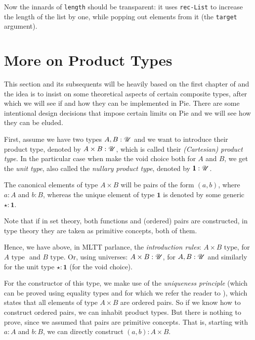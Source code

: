 Now the innards of \texttt{length} should be transparent: it uses \texttt{rec-List}
to increase the length of the list by one, while popping out elements
from it (the \texttt{target} argument).

\section{More on Product Types}
\label{sec:more-prod}

\indent\indent This section and its subsequents will be heavily based on the first chapter of
\cite{hott} and the idea is to insist on some theoretical aspects of certain
composite types, after which we will see if and how they can be implemented
in Pie. There are some intentional design decisions that impose certain
limits on Pie and we will see how they can be eluded.

First, assume we have two types $ A, B : \mathscr{U} $ and we want to introduce
their product type, denoted by $ A \times B : \mathscr{U} $, which is called their
\emph{(Cartesian) product type.} In the particular case when make the
void choice both for $ A $ and $ B $, we get the \emph{unit type},
also called the \emph{nullary product type}, denoted by $ \pmb{1} : \mathscr{U} $.

The canonical elements of type $ A \times B $ will be pairs of the form
$ (a, b) $, where $ a : A $ and $ b : B $, whereas the unique element of
type $ \pmb{1} $ is denoted by some generic $ \star : \pmb{1} $.

Note that if in set theory, both functions and (ordered) pairs are constructed,
in type theory they are taken as primitive concepts, both of them.

Hence, we have above, in MLTT parlance, the \emph{introduction rules}:
$ A \times B \text{ type} $, for $ A \text{ type } $ and $ B \text{ type} $.
Or, using universes: $ A \times B : \mathscr{U} $, for $ A, B : \mathscr{U} $ and
similarly for the unit type $ \star : \pmb{1} $ (for the void choice).

For the constructor of this type, we make use of the \emph{uniqueness principle}
(which can be proved using equality types and for which we refer the reader
to \cite[p.\ 29]{hott}), which states that all elements of type $ A \times B $
are ordered pairs. So if we know how to construct ordered pairs, we can inhabit
product types. But there is nothing to prove, since we assumed that pairs are
primitive concepts. That is, starting with $ a : A $ and $ b : B $, we can
directly construct $ (a, b) : A \times B $.

